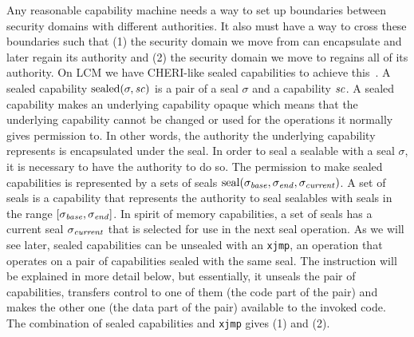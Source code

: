 \documentclass[acmsmall,screen]{acmart}\settopmatter{}
\newcommand{\trgcm}{\textsc{LCM}}
\begin{document}
Any reasonable capability machine needs a way to set up boundaries between security domains with different authorities.
It also must have a way to cross these boundaries such that (1) the security domain we move from can encapsulate and later regain its authority and (2) the security domain we move to regains all of its authority. 
On \trgcm{} we have CHERI-like sealed capabilities to achieve this~\cite{watson_cheri_2015,watson_fast_2016}.
A sealed capability $\mathrm{sealed}(\sigma,\mathit{sc})$ is a pair of a seal $\sigma$ and a capability $\mathit{sc}$.
A sealed capability makes an underlying capability opaque which means that the underlying capability cannot be changed or used for the operations it normally gives permission to.
In other words, the authority the underlying capability represents is encapsulated under the seal.
In order to seal a sealable with a seal $\sigma$, it is necessary to have the authority to do so.
The permission to make sealed capabilities is represented by a sets of seals $\mathrm{seal}(\sigma_{\mathit{base}},\sigma_{\mathit{end}},\sigma_{\mathit{current}})$.
A set of seals is a capability that represents the authority to seal sealables with seals in the range $[\sigma_{\mathit{base}},\sigma_{\mathit{end}}]$.
In spirit of memory capabilities, a set of seals has a current seal $\sigma_{\mathit{current}}$ that is selected for use in the next seal operation.
As we will see later, sealed capabilities can be unsealed with an \texttt{xjmp}, an operation that operates on a pair of capabilities sealed with the same seal.
The instruction will be explained in more detail below, but essentially, it unseals the pair of capabilities, transfers control to one of them (the code part of the pair) and makes the other one (the data part of the pair) available to the invoked code.
The combination of sealed capabilities and \texttt{xjmp} gives (1) and (2).
\end{document}
